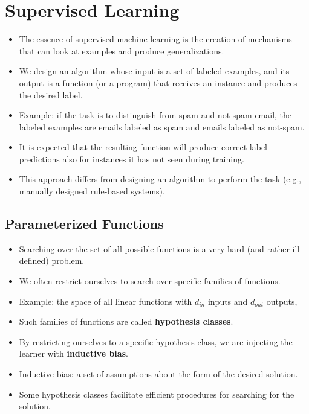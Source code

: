 \section{Supervised Learning}

\begin{itemize}
\item The essence of supervised machine learning is the creation of mechanisms that can look at examples and produce generalizations. \cite{goldberg2017neural}
\item We design an algorithm whose input is a set of labeled examples, and
its output is a function (or a program) that receives an instance and produces the desired label.
\item Example: if the task is to distinguish from spam and not-spam email, the labeled examples are emails labeled as spam and emails labeled as not-spam.
\item It is expected that the resulting function will produce correct label
predictions also for instances it has not seen during training.
\item This approach differs from designing an algorithm to perform the task (e.g., manually designed rule-based systems).
\end{itemize}



\subsection{Parameterized Functions}
\begin{itemize}
\item Searching over the set of all possible functions is a very hard (and rather ill-defined) problem. \cite{goldberg2017neural}
\item We often restrict ourselves to search over specific families of functions.
\item Example: the space of all linear functions with $d_{in}$ inputs and $d_{out}$ outputs, 
\item Such families of functions are called \textbf{hypothesis classes}. 
\item By restricting ourselves to a specific hypothesis class, we are injecting the learner with \textbf{inductive bias}.
\item Inductive bias: a set of assumptions about the form of the desired solution.
\item Some hypothesis classes facilitate efficient procedures for searching for the solution. \cite{goldberg2017neural}
\end{itemize}




